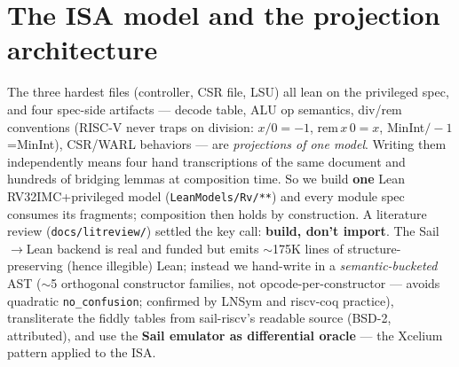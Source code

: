 \documentclass[10pt]{article}
\newcommand{\code}[1]{\texttt{#1}}
\begin{document}
\section{The ISA model and the projection architecture}
The three hardest files (controller, CSR file, LSU) all lean on the privileged spec, and
four spec-side artifacts --- decode table, ALU op semantics, div/rem conventions
(RISC-V never traps on division: $x/0=-1$, $\mathrm{rem}\,x\,0=x$, MinInt$/-1$=MinInt),
CSR/WARL behaviors --- are \emph{projections of one model}. Writing them independently
means four hand transcriptions of the same document and hundreds of bridging lemmas at
composition time. So we build \textbf{one} Lean RV32IMC+privileged model
(\code{LeanModels/Rv/**}) and every module spec consumes its fragments; composition then
holds by construction. A literature review (\code{docs/litreview/}) settled the key call:
\textbf{build, don't import}. The Sail$\to$Lean backend is real and funded but emits
$\sim$175K lines of structure-preserving (hence illegible) Lean; instead we hand-write in
a \emph{semantic-bucketed} AST ($\sim$5 orthogonal constructor families, not
opcode-per-constructor --- avoids quadratic \code{no\_confusion}; confirmed by LNSym and
riscv-coq practice), transliterate the fiddly tables from sail-riscv's readable source
(BSD-2, attributed), and use the \textbf{Sail emulator as differential oracle} --- the
Xcelium pattern applied to the ISA.
\end{document}
